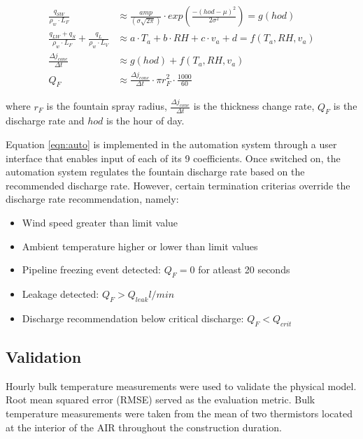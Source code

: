 \documentclass[tc, manuscript]{copernicus}
\begin{document}
\begin{subequations}
	\begin{align}
		\label{eqn:sun}
  \frac{q_{SW}}{\rho_w \cdot L_F} & \approx \frac{amp}{(\sigma \sqrt{2\pi})} \cdot
  exp\left(\frac{-(hod-\mu)^2}{2\sigma^2}\right) = g(hod)  \\
		\label{eqn:T}
   \frac{q_{LW} + q_{S}}{\rho_w \cdot L_F} + \frac{q_L}{\rho_w \cdot L_V} & \approx a \cdot T_a + b \cdot RH + c \cdot v_a +
  d = f(T_a, RH, v_a) \\
		\label{eqn:temp}
  \frac{\Delta j_{cone}}{\Delta t} & \approx g(hod) + f(T_a, RH, v_a)\\
		\label{eqn:auto}
  Q_{F} & \approx \frac{\Delta j_{cone}}{\Delta t} \cdot \pi r_{F}^2 \cdot
  \frac{1000}{60}
	\end{align}
\end{subequations}

where $r_F$ is the fountain spray radius, $\frac{\Delta j_{cone}}{\Delta t}$ is the thickness change rate,
$Q_{F}$ is the discharge rate and $hod$ is the hour of day.

Equation \ref{eqn:auto} is implemented in the automation system through a user interface that enables input of
each of its 9 coefficients. Once switched on, the automation system regulates the fountain discharge rate based
on the recommended discharge rate. However, certain termination criterias override the discharge rate
recommendation, namely: 

\begin{itemize}
\item Wind speed greater than limit value
\item Ambient temperature higher or lower than limit values
\item Pipeline freezing event detected: $Q_F = 0$ for atleast 20 seconds
\item Leakage detected: $Q_F > Q_{leak} l/min$
\item Discharge recommendation below critical discharge: $Q_F < Q_{crit}$
\end{itemize}

\subsection{Validation}
 Hourly bulk temperature measurements were used to validate the physical model. Root mean squared error (RMSE)
 served as the evaluation metric. Bulk temperature measurements were taken from the mean of two thermistors
 located at the interior of the AIR throughout the construction duration.
\end{document}
